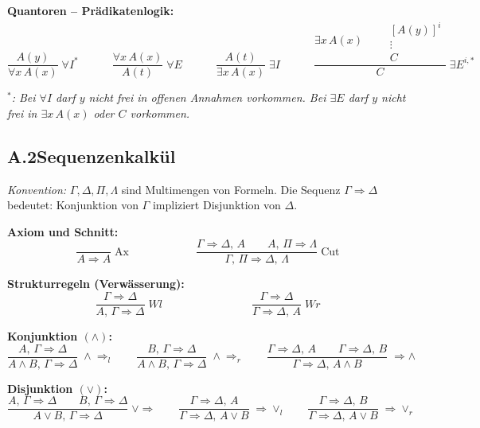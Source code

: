 \medskip
\noindent\textbf{Quantoren -- Prädikatenlogik:}
\[
\dfrac{A(y)}{\forall x\,A(x)}\;{\forall I^{*}}
\qquad\quad
\dfrac{\forall x\,A(x)}{A(t)}\;{\forall E}
\qquad\quad
\dfrac{A(t)}{\exists x\,A(x)}\;{\exists I}
\qquad\quad
\dfrac{\exists x\,A(x) \qquad \begin{array}{c}[A(y)]^i \\ \vdots \\ C\end{array}}{C}\;{\exists E^{i,*}}
\]

\noindent\textit{${}^*$: Bei $\forall I$ darf $y$ nicht frei in offenen Annahmen vorkommen. Bei $\exists E$ darf $y$ nicht frei in $\exists x\,A(x)$ oder $C$ vorkommen.}

\subsection*{A.2\quad Sequenzenkalkül}

\textit{Konvention:} $\Gamma, \Delta, \Pi, \Lambda$ sind Multimengen von Formeln. Die Sequenz $\Gamma \Rightarrow \Delta$ bedeutet: Konjunktion von $\Gamma$ impliziert Disjunktion von $\Delta$.

\medskip
\noindent\textbf{Axiom und Schnitt:}
\[
\dfrac{\phantom{X}}{A \Rightarrow A}\;\mathrm{Ax}
\qquad\qquad\qquad
\dfrac{\Gamma \Rightarrow \Delta,\, A \qquad A,\, \Pi \Rightarrow \Lambda}{\Gamma,\,\Pi \Rightarrow \Delta,\,\Lambda}\;\mathrm{Cut}
\]

\medskip
\noindent\textbf{Strukturregeln (Verwässerung):}
\[
\dfrac{\Gamma \Rightarrow \Delta}{A,\,\Gamma \Rightarrow \Delta}\;Wl
\qquad\qquad\qquad\qquad
\dfrac{\Gamma \Rightarrow \Delta}{\Gamma \Rightarrow \Delta,\,A}\;Wr
\]

\medskip
\noindent\textbf{Konjunktion $(\wedge)$:}
\[
\dfrac{A,\,\Gamma \Rightarrow \Delta}{A \wedge B,\,\Gamma \Rightarrow \Delta}\;\wedge\Rightarrow_l
\qquad
\dfrac{B,\,\Gamma \Rightarrow \Delta}{A \wedge B,\,\Gamma \Rightarrow \Delta}\;\wedge\Rightarrow_r
\qquad
\dfrac{\Gamma \Rightarrow \Delta,\,A \qquad \Gamma \Rightarrow \Delta,\,B}{\Gamma \Rightarrow \Delta,\,A \wedge B}\;\Rightarrow\wedge
\]

\medskip
\noindent\textbf{Disjunktion $(\vee)$:}
\[
\dfrac{A,\,\Gamma \Rightarrow \Delta \qquad B,\,\Gamma \Rightarrow \Delta}{A \vee B,\,\Gamma \Rightarrow \Delta}\;\vee\Rightarrow
\qquad
\dfrac{\Gamma \Rightarrow \Delta,\,A}{\Gamma \Rightarrow \Delta,\,A \vee B}\;\Rightarrow\vee_l
\qquad
\dfrac{\Gamma \Rightarrow \Delta,\,B}{\Gamma \Rightarrow \Delta,\,A \vee B}\;\Rightarrow\vee_r
\]

